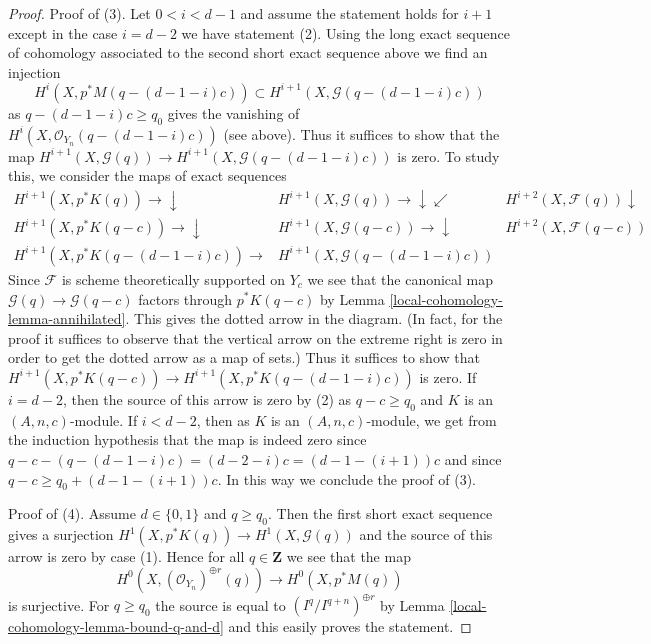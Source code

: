 \begin{proof}
\medskip\noindent
Proof of (3). Let $0 < i < d - 1$ and assume the statement holds for $i + 1$
except in the case $i = d - 2$ we have statement (2).
Using the long exact sequence of cohomology associated to the second
short exact sequence above we find an injection
$$
H^i(X, p^*M(q - (d - 1 - i)c)) \subset
H^{i + 1}(X, \mathcal{G}(q - (d - 1 - i)c))
$$
as $q - (d - 1 - i)c \geq q_0$ gives the vanishing of
$H^i(X, \mathcal{O}_{Y_n}(q - (d - 1 - i)c))$
(see above). Thus it suffices to show that the map
$H^{i + 1}(X, \mathcal{G}(q)) \to H^{i + 1}(X, \mathcal{G}(q - (d - 1 - i)c))$
is zero. To study this, we consider the maps of exact sequences
$$
\begin{array}{ccc}H^{i + 1}(X, p^*K(q)) \longrightarrow\downarrow & H^{i + 1}(X, \mathcal{G}(q)) \longrightarrow\downarrow\swarrow & H^{i + 2}(X, \mathcal{F}(q)) \downarrow \\ H^{i + 1}(X, p^*K(q - c)) \longrightarrow\downarrow & H^{i + 1}(X, \mathcal{G}(q - c)) \longrightarrow\downarrow & H^{i + 2}(X, \mathcal{F}(q - c)) \\ H^{i + 1}(X, p^*K(q - (d - 1 - i)c)) \longrightarrow & H^{i + 1}(X, \mathcal{G}(q - (d - 1 - i)c)) & \end{array}
$$
Since $\mathcal{F}$ is scheme theoretically supported on $Y_c$
we see that the canonical map
$\mathcal{G}(q) \to \mathcal{G}(q - c)$ factors through
$p^*K(q - c)$ by Lemma \ref{local-cohomology-lemma-annihilated}.
This gives the dotted arrow in the diagram. (In fact, for the proof it
suffices to observe that the vertical arrow on the extreme right is
zero in order to get the dotted arrow as a map of sets.)
Thus it suffices to show that
$H^{i + 1}(X, p^*K(q - c)) \to
H^{i + 1}(X, p^*K(q - (d - 1 - i)c))$
is zero. If $i = d - 2$, then the source of this arrow
is zero by (2) as $q - c \geq q_0$ and $K$ is an $(A, n, c)$-module.
If $i < d - 2$, then as $K$ is an $(A, n, c)$-module, we get from the
induction hypothesis that the map is indeed zero
since $q - c - (q - (d - 1 - i)c) = (d - 2 - i)c = (d - 1 - (i + 1))c$
and since $q - c \geq q_0 + (d - 1 - (i + 1))c$.
In this way we conclude the proof of (3).

\medskip\noindent
Proof of (4). Assume $d \in \{0, 1\}$ and $q \geq q_0$.
Then the first short exact sequence gives a surjection
$H^1(X, p^*K(q)) \to H^1(X, \mathcal{G}(q))$
and the source of this arrow is zero by case (1). Hence
for all $q \in \mathbf{Z}$ we see that the map
$$
H^0(X, (\mathcal{O}_{Y_n})^{\oplus r}(q))
\longrightarrow
H^0(X, p^*M(q))
$$
is surjective. For $q \geq q_0$ the
source is equal to $(I^q/I^{q + n})^{\oplus r}$ by
Lemma \ref{local-cohomology-lemma-bound-q-and-d} and this easily proves the statement.


\end{proof}
